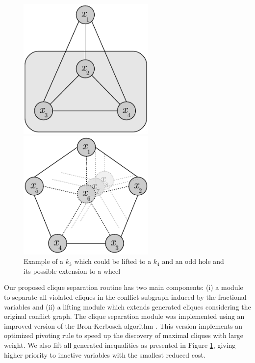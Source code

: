 \documentclass{endm}
\begin{document}
\begin{figure}	
	\begin{minipage}[h]{.5\textwidth}
		\begin{center}
			\includegraphics[width=0.6\textwidth]{clique.pdf}
		\end{center}
	\end{minipage}
	\begin{minipage}[h]{.5\textwidth}
		\begin{center}
			\includegraphics[width=0.6\textwidth]{oddHole.pdf}
		\end{center}
	\end{minipage}
	\caption{Example of a $k_{3}$ which could be lifted to a $k_{4}$    and an odd hole and its possible extension to a wheel} \label{figLiftings}
\end{figure}

Our proposed clique separation routine has two main components: (i) a module to separate all violated cliques in the conflict subgraph induced by the fractional variables and (ii) a lifting module which extends generated cliques considering the original conflict graph. The clique separation module was implemented using an improved version of the Bron-Kerbosch algorithm \cite{Bron1973}. This version implements an optimized pivoting rule \cite{Brito2011} to speed up the discovery of maximal cliques with large weight.  We also lift all generated inequalities as presented in Figure \ref{figLiftings}, giving higher priority to inactive variables with the smallest reduced cost.  
\end{document}
